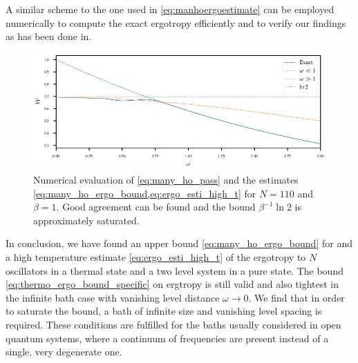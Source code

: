 A similar scheme to the one used in \cref{eq:manhoergoestimate} can be
employed numerically to compute the exact ergotropy efficiently and to verify our
findings as has been done in.
\begin{figure}[ht]
  \includegraphics{figs/ergo_calc/ergo_numeric}
  \caption{\label{fig:numeric_n_ho_ergo} Numerical evaluation of
    \cref{eq:many_ho_pass} and the estimates
    \cref{eq:many_ho_ergo_bound,eq:ergo_esti_high_t} for \(N=110\)
    and \(β=1\). Good agreement can be found and the bound
    \(β^{-1}\ln2\) is approximately saturated.}
\end{figure}

In conclusion, we have found an upper bound
\cref{eq:many_ho_ergo_bound} for and a high temperature estimate
\cref{eq:ergo_esti_high_t} of the ergotropy to \(N\) oscillators in a
thermal state and a two level system in a pure state. The bound
\cref{eq:thermo_ergo_bound_specific} on ergtropy is still valid and
also tightest in the infinite bath case with vanishing level distance
\(ω\to 0\). We find that in order to saturate the bound, a bath of
infinite size and vanishing level spacing is required. These
conditions are fulfilled for the baths usually considered in open
quantum systems, where a continuum of frequencies are present instead
of a single, very degenerate one.

